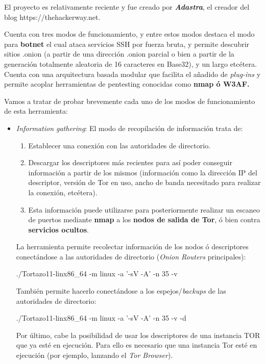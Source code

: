 El proyecto es relativamente reciente y fue creado por \textbf{\textit{Adastra}}, el creador del blog https://thehackerway.net.

Cuenta con tres modos de funcionamiento, y entre estos modos destaca el modo para \textbf{botnet} el cual ataca servicios SSH por fuerza bruta, y permite descubrir sitios .onion (a partir de una dirección .onion parcial o bien a partir de la generación totalmente aleatoria de 16 caracteres en Base32), y un largo etcétera. Cuenta con una arquitectura basada modular que facilita el añadido de \textit{plug-ins} y permite acoplar herramientas de pentesting conocidas como \textbf{nmap ó W3AF.}

Vamos a tratar de probar brevemente cada uno de los modos de funcionamiento de esta herramienta:

\begin{itemize}
	\item{\textit{Information gathering}}: El modo de recopilación de información trata de:
	\begin{enumerate}
		\item Establecer una conexión con las autoridades de directorio.
		\item Descargar los descriptores más recientes para así poder conseguir información a partir de los mismos (información como  la dirección IP del descriptor, versión de Tor en uso, ancho de banda necesitado para realizar la conexión, etcétera). 
		\item Esta información puede utilizarse para posteriormente realizar un escaneo de puertos mediante \textbf{nmap} a los \textbf{nodos de salida de Tor}, ó bien contra \textbf{servicios ocultos}. 
	\end{enumerate}
	
	La herramienta permite recolectar información de los nodos ó descriptores conectándose a las autoridades de directorio (\textit{Onion Routers} principales):
	
	{\selectfont 
		./Tortazo11-linx86\_64 -m linux -a '-sV -A' -n 35 -v
	}
	
	También permite hacerlo conectándose a los espejos/\textit{backups} de las autoridades de directorio:
	
	{\selectfont 
		./Tortazo11-linx86\_64 -m linux -a '-sV -A' -n 35 -v -d
	}
	
	Por último, cabe la posibilidad de usar los descriptores de una instancia TOR que ya esté en ejecución. Para ello es necesario que una instancia Tor esté en ejecución (por ejemplo, lanzando el \textit{Tor Browser}).
	

\end{itemize}
